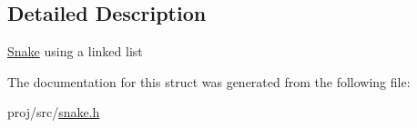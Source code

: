 \subsection{Detailed Description}
\hyperlink{structSnake}{Snake} using a linked list 

The documentation for this struct was generated from the following file\+:\begin{DoxyCompactItemize}
\item 
proj/src/\hyperlink{snake_8h}{snake.\+h}\end{DoxyCompactItemize}
